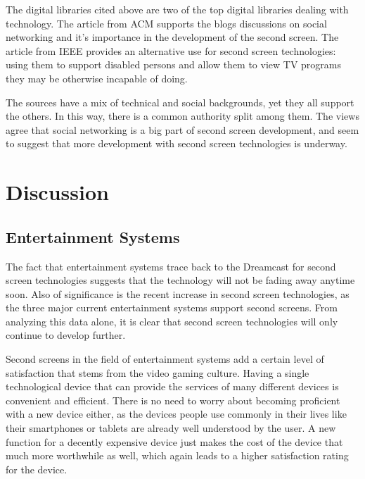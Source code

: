 \documentclass[11pt, oneside]{article}
\begin{document}
The digital libraries cited above are two of the top digital libraries dealing with technology. The article from ACM supports the blogs discussions on social networking and it's importance in the development of the second screen. The article from IEEE provides an alternative use for second screen technologies: using them to support disabled persons and allow them to view TV programs they may be otherwise incapable of doing.

The sources have a mix of technical and social backgrounds, yet they all support the others. In this way, there is a common authority split among them. The views agree that social networking is a big part of second screen development, and seem to suggest that more development with second screen technologies is underway.

\section{Discussion}

\subsection{Entertainment Systems}
The fact that entertainment systems trace back to the Dreamcast for second screen technologies suggests that the technology will not be fading away anytime soon. Also of significance is the recent increase in second screen technologies, as the three major current entertainment systems support second screens. From analyzing this data alone, it is clear that second screen technologies will only continue to develop further.

Second screens in the field of entertainment systems add a certain level of satisfaction that stems from the video gaming culture. Having a single technological device that can provide the services of many different devices is convenient and efficient. There is no need to worry about becoming proficient with a new device either, as the devices people use commonly in their lives like their smartphones or tablets are already well understood by the user. A new function for a decently expensive device just makes the cost of the device that much more worthwhile as well, which again leads to a higher satisfaction rating for the device. 
\end{document}
